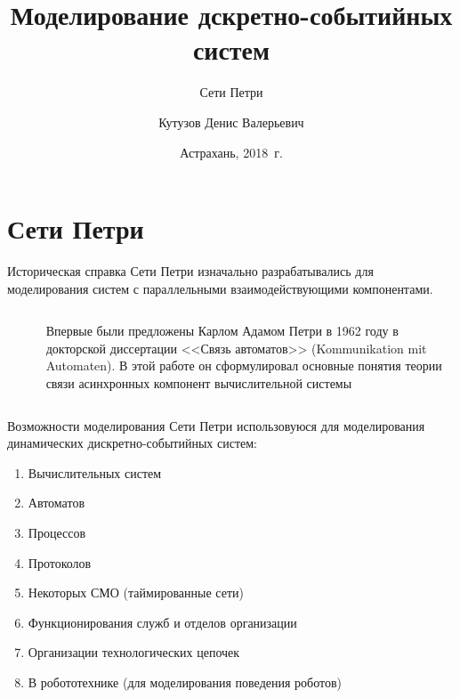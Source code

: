 \documentclass[unicode, notheorems]{beamer}
\title{Моделирование дскретно-событийных систем}
\subtitle{Сети Петри}
\author[Д.В.Кутузов]{Кутузов Денис Валерьевич}
\institute[АГТУ]{<<Астраханский государственный технический университет>>}
\date{Астрахань, 2018~г.}
\begin{document}
\begin{frame}
\titlepage
\end{frame}


\section{Сети Петри}

\begin{frame}{Историческая справка}
Сети Петри изначально разрабатывались для моделирования систем с параллельными взаимодействующими компонентами.
\newline
\begin{columns}
  \begin{column}{.3\linewidth}  %
    \begin{figure}[!h]
    \centering {}
    \end{figure}
   \end{column}
  \begin{column}{.6\linewidth}  %
   Впервые были предложены Карлом Адамом Петри в 1962 году в докторской диссертации <<Связь автоматов>> 
(Kommunikation mit Automaten). В этой работе он сформулировал основные понятия теории связи асинхронных 
компонент вычислительной системы  
  \end{column}
\end{columns}
\end{frame}
 


\begin{frame}{Возможности моделирования}
Сети Петри использовуюся для моделирования динамических дискретно-событийных систем:
\begin{enumerate}
  \item Вычислительных систем
  \item Автоматов
  \item Процессов
  \item Протоколов
  \item Некоторых СМО (таймированные сети)
  \item Функционирования служб и отделов организации
  \item Организации технологических цепочек
  \item В робототехнике (для моделирования поведения роботов)
\end{enumerate}
\end{frame}
\end{document}
